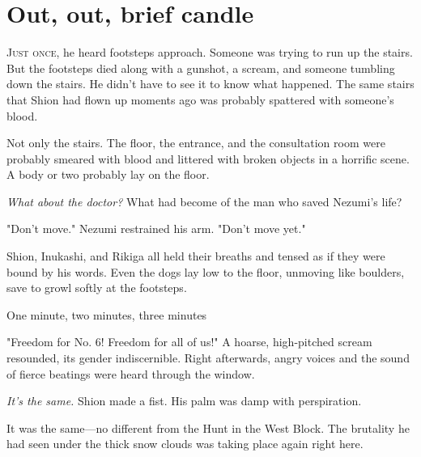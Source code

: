 
\chapter{Out, out, brief candle}


\lettrine{J}{ust once}, he heard footsteps approach. Someone was trying to run up the
stairs. But the footsteps died along with a gunshot, a scream, and
someone tumbling down the stairs. He didn't have to see it to know what
happened. The same stairs that Shion had flown up moments ago was
probably spattered with someone's blood.

Not only the stairs. The floor, the entrance, and the consultation room
were probably smeared with blood and littered with broken objects in a
horrific scene. A body or two probably lay on the floor.

\emph{What about the doctor?} What had become of the man who saved Nezumi's
life?

"Don't move." Nezumi restrained his arm. "Don't move yet."

Shion, Inukashi, and Rikiga all held their breaths and tensed as if they
were bound by his words. Even the dogs lay low to the floor, unmoving
like boulders, save to growl softly at the footsteps.

One minute, two minutes, three minutes\el 

"Freedom for No. 6! Freedom for all of us!" A hoarse, high-pitched
scream resounded, its gender indiscernible. Right afterwards, angry
voices and the sound of fierce beatings were heard through the window.

\emph{It's the same.} Shion made a fist. His palm was damp with perspiration.

It was the same---no different from the Hunt in the West Block. The
brutality he had seen under the thick snow clouds was taking place again
right here.

